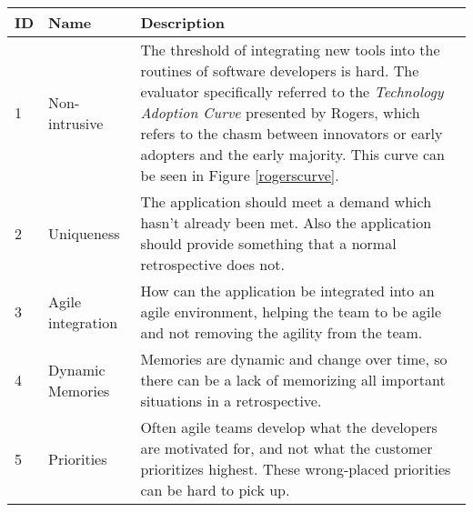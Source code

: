 \begin{table}[H]
    \begin{tabularx}{\textwidth}{|l|l|X|}
    \hline
    ID & Name                & Description                                                                                                                                                                                                                                                                                                                                                    \\ \hline
    1  & Non-intrusive       & The threshold of integrating new tools into the routines of software developers is hard. The evaluator specifically referred to the \emph{Technology Adoption Curve} presented by Rogers\citep{rogers2010diffusion}, which refers to the chasm between innovators or early adopters and the early majority. This curve can be seen in Figure \ref{rogerscurve}. \\ \hline
    2  & Uniqueness          & The application should meet a demand which hasn't already been met. Also the application should provide something that a normal retrospective does not.                                                                                                                                                                                                        \\ \hline
    3  & Agile integration   & How can the application be integrated into an agile environment, helping the team to be agile and not removing the agility from the team.                                                                                                                                                                                                                      \\ \hline
    4  & Dynamic Memories    & Memories are dynamic and change over time, so there can be a lack of memorizing all important situations in a retrospective.                                                                                                                                                                                                                                   \\ \hline
    5  & Priorities          & Often agile teams develop what the developers are motivated for, and not what the customer prioritizes highest. These wrong-placed priorities can be hard to pick up.                                                                                                                                                                                          \\ \hline

\end{tabularx}
\end{table}
